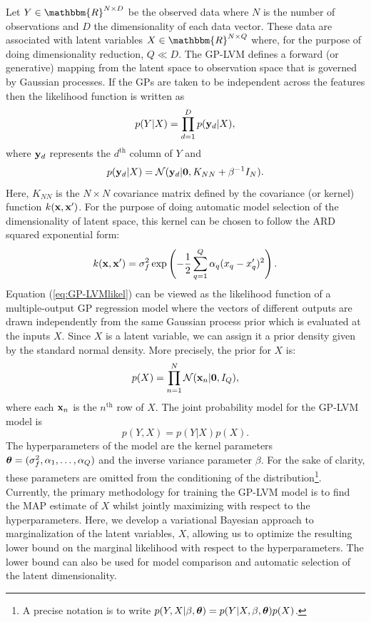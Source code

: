 \documentclass[twoside,times]{article}
\begin{document}
Let $Y \in \mathbbm{R}^{N \times D}$ be the observed data where $N$ is
the number of observations and $D$ the dimensionality of each data
vector. These data are associated with latent variables $X \in
\mathbbm{R}^{N \times Q}$ where, for the purpose of doing
dimensionality reduction, $Q \ll D$.  The GP-LVM
\citep{Lawrence:pnpca05} defines a forward (or generative) mapping
from the latent space to observation space that is governed by
Gaussian processes. If the GPs are taken to be independent across the
features then the likelihood function is written as
\begin{equation}
p(Y|X) = \prod_{d=1}^D p(\mathbf{y}_d|X),
\label{eq:GP-LVMlikel}
\end{equation} 
where $\mathbf{y}_d$ represents the $d^{\text{th}}$ column of $Y$ and 
\begin{equation}
p(\mathbf{y}_d|X) = \mathcal{N}(\mathbf{y}_d|\mathbf{0}, K_{NN} + \beta^{-1} I_N).
\end{equation}         
Here, $K_{NN}$ is the $N \times N$ covariance matrix defined by the covariance (or kernel)
function $k(\mathbf{x},\mathbf{x}')$. For the purpose of doing automatic model
selection of the dimensionality of latent space, this kernel can
be chosen to follow the ARD \citep[see][]{Rasmussen:book06} squared
exponential form:
\begin{equation}
k(\mathbf{x},\mathbf{x}') = \sigma_f^2 \exp\left( - \frac{1}{2} \sum_{q=1}^Q
\alpha_q (x_q - x_q')^2 \right). 
\label{eq:ARDkernel}
\end{equation} 
Equation (\ref{eq:GP-LVMlikel}) can be viewed as the likelihood
function of a multiple-output GP regression model where the vectors of
different outputs are drawn independently from the same Gaussian
process prior which is evaluated at the inputs $X$.  Since $X$ is a
latent variable, we can assign it a prior density given by the
standard normal density. %
More precisely, the prior for $X$ is:
\begin{equation} 
p(X) = \prod_{n=1}^N \mathcal{N}(\mathbf{x}_n|\mathbf{0},I_Q), 
\end{equation}
where each $\mathbf{x}_n$ is the $n^{\text{th}}$ row of $X$.
The joint probability model for the GP-LVM model is 
\begin{equation}
p(Y,X) = p(Y|X) p(X).
\end{equation}
The hyperparameters of the model are the kernel parameters $\boldsymbol{\theta} =
(\sigma_f^2, \alpha_1,\ldots,\alpha_Q)$
and the inverse variance parameter $\beta$.  For the sake of clarity,
these parameters are omitted from the conditioning of the
distribution\footnote{A precise notation is to write
  $p(Y,X|\beta,\boldsymbol{\theta}) = p(Y|X,\beta,\boldsymbol{\theta}) p(X)$.}.  Currently,
the primary methodology for training the GP-LVM model is to find the
MAP estimate of $X$ \citep{Lawrence:pnpca05} whilst jointly maximizing
with respect to the hyperparameters. Here, we develop a variational
Bayesian approach to marginalization of the latent variables, $X$,
allowing us to optimize the resulting lower bound on the marginal
likelihood with respect to the hyperparameters. The lower bound can
also be used for model comparison and automatic selection of the latent
dimensionality.
\end{document}
